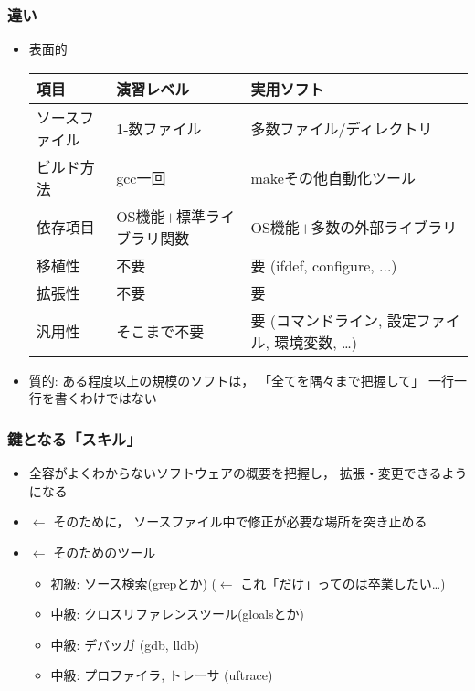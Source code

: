 \documentclass[12pt,dvipdfmx]{beamer}
\newcommand{\mura}[1]{{\color{purple}#1}}
\newcommand{\ao}[1]{{\color{blue}#1}}
\begin{document}
\begin{frame}
\frametitle{違い}
\begin{itemize}
\item 表面的
{\small
\begin{tabular}{|p{2.5cm}|p{2.5cm}|p{4.5cm}|}\hline
項目 & 演習レベル & 実用ソフト \\\hline
ソースファイル & 1-数ファイル & 
多数ファイル/ディレクトリ \\
ビルド方法 & gcc一回 & makeその他自動化ツール \\
依存項目 & OS機能$+$標準ライブラリ関数
& OS機能$+$多数の外部ライブラリ \\
移植性 & 不要 & 要 (ifdef, configure, ...) \\
拡張性 & 不要 & 要 \\
汎用性 & そこまで不要 & 要 (コマンドライン, 設定ファイル, 環境変数, \ldots) \\\hline
\end{tabular}}

\item 質的:
ある程度以上の規模のソフトは，
\mura{「全てを隅々まで把握して」
  一行一行を書くわけではない}
\end{itemize}
\end{frame}

\begin{frame}
\frametitle{鍵となる「スキル」}
\begin{itemize}
\item<1-> 全容がよくわからないソフトウェアの概要を把握し，
  拡張・変更できるようになる
\item<2-> $\leftarrow$ そのために，
  \ao{ソースファイル中で修正が必要な場所}を突き止める
\item<3-> $\leftarrow$ そのためのツール
  \begin{itemize}
  \item 初級: ソース検索(grepとか) ($\leftarrow$ これ「だけ」ってのは卒業したい\ldots)
  \item 中級: \ao{クロスリファレンスツール(gloalsとか)}
  \item 中級: \ao{デバッガ (gdb, lldb)}
  \item 中級: \ao{プロファイラ, トレーサ (uftrace)}
  \end{itemize}

\end{itemize}
\end{frame}
\end{document}
